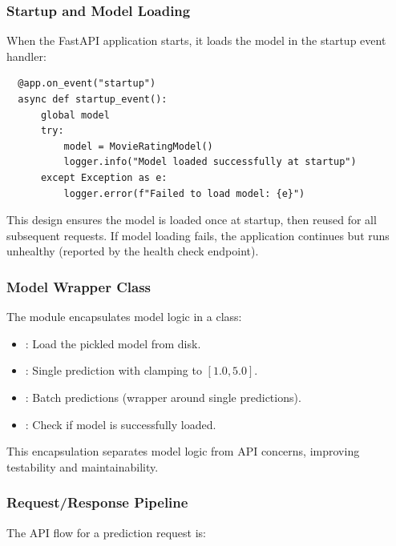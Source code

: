\subsubsection{Startup and Model Loading}

When the FastAPI application starts, it loads the model in the startup event handler:

\begin{verbatim}
  @app.on_event("startup")
  async def startup_event():
      global model
      try:
          model = MovieRatingModel()
          logger.info("Model loaded successfully at startup")
      except Exception as e:
          logger.error(f"Failed to load model: {e}")
\end{verbatim}

This design ensures the model is loaded once at startup, then reused for all subsequent requests. 
If model loading fails, the application continues but runs unhealthy (reported by the health check endpoint).

\subsubsection{Model Wrapper Class}

The  module encapsulates model logic in a  class:

\begin{itemize}
  \item {}: Load the pickled model from disk.
  \item {}: Single prediction with clamping to $[1.0, 5.0]$.
  \item {}: Batch predictions (wrapper around single predictions).
  \item {}: Check if model is successfully loaded.
\end{itemize}

This encapsulation separates model logic from API concerns, improving testability and maintainability.

\subsubsection{Request/Response Pipeline}

The API flow for a prediction request is:

